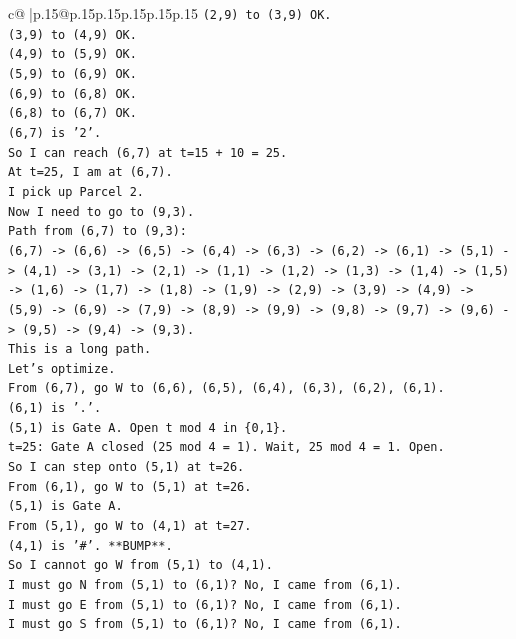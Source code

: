 \documentclass{article}
\begin{document}
{\begin{supertabular}{c@{$\;$}|p{.15\linewidth}@{}p{.15\linewidth}p{.15\linewidth}p{.15\linewidth}p{.15\linewidth}p{.15\linewidth}}
{{{\texttt{(2,9) to (3,9) OK.} \\
\texttt{(3,9) to (4,9) OK.} \\
\texttt{(4,9) to (5,9) OK.} \\
\texttt{(5,9) to (6,9) OK.} \\
\texttt{(6,9) to (6,8) OK.} \\
\texttt{(6,8) to (6,7) OK.} \\
\texttt{(6,7) is '2'.} \\
\texttt{So I can reach (6,7) at t=15 + 10 = 25.} \\
\texttt{At t=25, I am at (6,7).} \\
\texttt{I pick up Parcel 2.} \\
\texttt{Now I need to go to (9,3).} \\
\texttt{Path from (6,7) to (9,3):} \\
\texttt{(6,7) {-}> (6,6) {-}> (6,5) {-}> (6,4) {-}> (6,3) {-}> (6,2) {-}> (6,1) {-}> (5,1) {-}> (4,1) {-}> (3,1) {-}> (2,1) {-}> (1,1) {-}> (1,2) {-}> (1,3) {-}> (1,4) {-}> (1,5) {-}> (1,6) {-}> (1,7) {-}> (1,8) {-}> (1,9) {-}> (2,9) {-}> (3,9) {-}> (4,9) {-}> (5,9) {-}> (6,9) {-}> (7,9) {-}> (8,9) {-}> (9,9) {-}> (9,8) {-}> (9,7) {-}> (9,6) {-}> (9,5) {-}> (9,4) {-}> (9,3).} \\
\texttt{This is a long path.} \\
\texttt{Let's optimize.} \\
\texttt{From (6,7), go W to (6,6), (6,5), (6,4), (6,3), (6,2), (6,1).} \\
\texttt{(6,1) is '.'.} \\
\texttt{(5,1) is Gate A. Open t mod 4 in \{0,1\}.} \\
\texttt{t=25: Gate A closed (25 mod 4 = 1). Wait, 25 mod 4 = 1. Open.} \\
\texttt{So I can step onto (5,1) at t=26.} \\
\texttt{From (6,1), go W to (5,1) at t=26.} \\
\texttt{(5,1) is Gate A.} \\
\texttt{From (5,1), go W to (4,1) at t=27.} \\
\texttt{(4,1) is '\#'. **BUMP**.} \\
\texttt{So I cannot go W from (5,1) to (4,1).} \\
\texttt{I must go N from (5,1) to (6,1)? No, I came from (6,1).} \\
\texttt{I must go E from (5,1) to (6,1)? No, I came from (6,1).} \\
\texttt{I must go S from (5,1) to (6,1)? No, I came from (6,1).} \\
}}}
\end{supertabular}}
\end{document}
